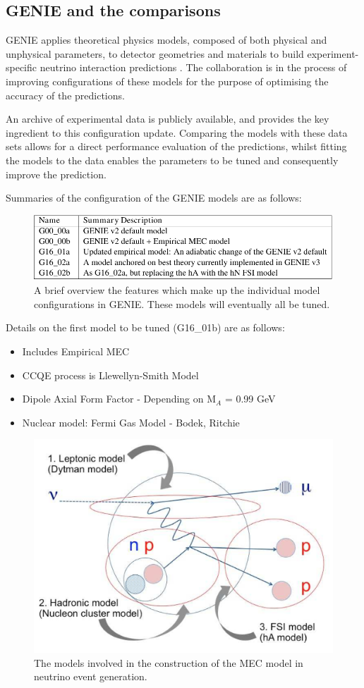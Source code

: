 
\subsection{GENIE and the comparisons}
GENIE applies theoretical physics models, composed of both physical and unphysical parameters, to detector geometries and materials to build experiment-specific neutrino interaction predictions \cite{genie}. The collaboration is in the process of improving configurations of these models for the purpose of optimising the accuracy of the predictions.

    An archive of experimental data is publicly available, and provides the key ingredient to this configuration update. Comparing the models with these data sets allows for a direct performance evaluation of the predictions, whilst fitting the models to the data enables the parameters to be tuned and consequently improve the prediction.

Summaries of the configuration of the GENIE models are as follows:

\begin{figure}[h!]
    \centering
    \includegraphics[width=\textwidth]{images/model_summaries.pdf}
    \caption{A brief overview the features which make up the individual model configurations in GENIE. These models will eventually all be tuned.}
    \label{tab:modelConfigs}
\end{figure}


Details on the first model to be tuned (G16\_01b) are as follows: 

\begin{itemize}
    \item Includes Empirical MEC
    \item CCQE process is Llewellyn-Smith Model
    \item Dipole Axial Form Factor - Depending on M\(_{A}\) = 0.99 GeV
    \item Nuclear model: Fermi Gas Model - Bodek, Ritchie
\end{itemize}

\begin{figure}[h!]
    \centering
    \includegraphics[width=.5\textwidth]{images/mec_model_genie.png}
    \caption{The models involved in the construction of the MEC model in neutrino event generation.}
    \label{fig:MECSchem}
\end{figure}

